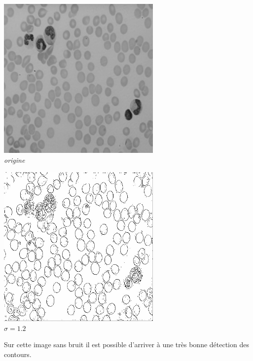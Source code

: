 \documentclass[a4,12pt]{article}
\begin{document}
\begin{center}
	\begin{minipage}[c]{0.49\linewidth}
		\begin{center}
			\includegraphics[width = 80mm]{./img/globules.jpg}\\
			\textit{origine}\\
		\end{center}
	\end{minipage}
	\begin{minipage}[c]{0.49\linewidth}
		\begin{center}
			\includegraphics[width = 80mm]{./img/ctrglobules-1_2.jpg}\\
			\textit{$\sigma = 1.2$}\\
		\end{center}
	\end{minipage}
\end{center}

Sur cette image sans bruit il est possible d'arriver à une très bonne détection des contours.\\
\end{document}
